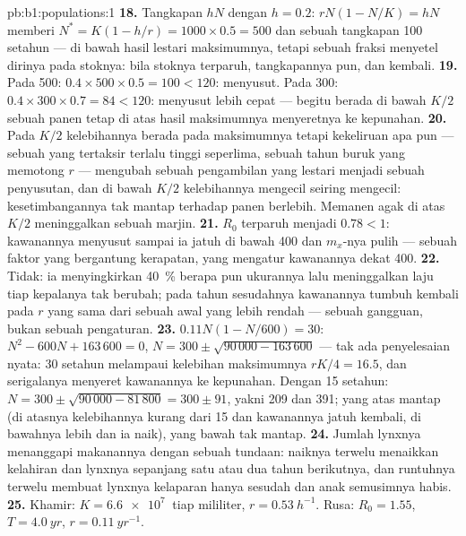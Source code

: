 \begin{solution}{pb:b1:populations:1}
\textbf{18.} Tangkapan $hN$ dengan $h = 0.2$: $rN(1 - N/K) = hN$ memberi $N^* =
K(1 - h/r) = 1000\times 0.5 = 500$ dan sebuah tangkapan \num{100} setahun
--- di bawah hasil lestari maksimumnya, tetapi sebuah fraksi menyetel
dirinya pada stoknya: bila stoknya terparuh, tangkapannya pun, dan
 kembali.
\textbf{19.} Pada 500: $0.4\times 500\times 0.5 = 100 < 120$: 
menyusut. Pada 300: $0.4\times 300\times 0.7 = 84 < 120$: menyusut lebih
cepat --- begitu berada di bawah $K/2$ sebuah panen tetap di atas hasil
maksimumnya menyeretnya ke kepunahan.
\textbf{20.} Pada $K/2$ kelebihannya berada pada maksimumnya tetapi
kekeliruan apa pun --- sebuah  yang tertaksir terlalu tinggi
seperlima, sebuah tahun buruk yang memotong $r$ --- mengubah sebuah
pengambilan yang lestari menjadi sebuah penyusutan, dan di bawah $K/2$
kelebihannya mengecil seiring  mengecil: kesetimbangannya
tak mantap terhadap panen berlebih. Memanen agak di atas $K/2$
meninggalkan sebuah marjin.
\textbf{21.} $R_0$ terparuh menjadi $0.78 < 1$: kawanannya menyusut
sampai ia jatuh di bawah 400 dan $m_x$-nya pulih --- sebuah faktor yang
bergantung kerapatan, yang mengatur kawanannya dekat 400.
\textbf{22.} Tidak: ia menyingkirkan \qty{40}{\%} berapa pun ukurannya
lalu meninggalkan laju tiap kepalanya tak berubah; pada tahun
sesudahnya kawanannya tumbuh kembali pada $r$ yang sama dari sebuah
awal yang lebih rendah --- sebuah gangguan, bukan sebuah pengaturan.
\textbf{23.} $0.11N(1 - N/600) = 30$: $N^2 - 600N + 163\,600 = 0$,
$N = 300\pm\sqrt{90\,000 - 163\,600}$ --- tak ada penyelesaian nyata: 30
setahun melampaui kelebihan maksimumnya $rK/4 = 16.5$, dan serigalanya
menyeret kawanannya ke kepunahan. Dengan 15 setahun: $N = 300\pm\sqrt{90\,000 -
81\,800} = 300\pm 91$, yakni 209 dan 391; yang atas mantap (di atasnya
kelebihannya kurang dari 15 dan kawanannya jatuh kembali, di bawahnya
lebih dan ia naik), yang bawah tak mantap.
\textbf{24.} Jumlah lynxnya menanggapi makanannya dengan sebuah
tundaan: naiknya terwelu menaikkan kelahiran dan  lynxnya
sepanjang satu atau dua tahun berikutnya, dan runtuhnya terwelu
membuat lynxnya kelaparan hanya sesudah  dan anak semusimnya
habis.
\textbf{25.} Khamir: $K = \qty{6.6e7}{}$  tiap mililiter, $r =
\qty{0.53}{h^{-1}}$. Rusa: $R_0 = 1.55$, $T = \qty{4.0}{yr}$, $r =
\qty{0.11}{yr^{-1}}$.
\end{solution}
